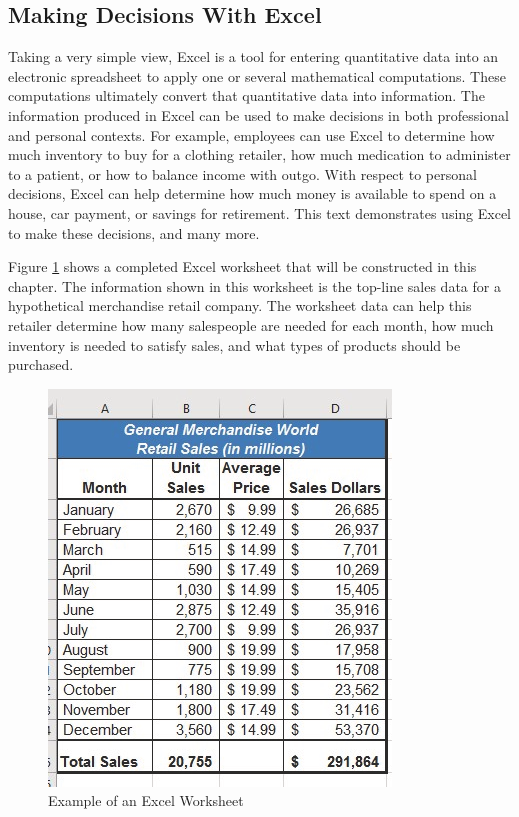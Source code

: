 \subsection{Making Decisions With Excel}

Taking a very simple view, Excel is a tool for entering quantitative data into an electronic spreadsheet to apply one or several mathematical computations. These computations ultimately convert that quantitative data into information. The information produced in Excel can be used to make decisions in both professional and personal contexts. For example, employees can use Excel to determine how much inventory to buy for a clothing retailer, how much medication to administer to a patient, or how to balance income with outgo. With respect to personal decisions, Excel can help determine how much money is available to spend on a house, car payment, or savings for retirement. This text demonstrates using Excel to make these decisions, and many more.

Figure \ref{01:fig01} shows a completed Excel worksheet that will be constructed in this chapter. The information shown in this worksheet is the top-line sales data for a hypothetical merchandise retail company. The worksheet data can help this retailer determine how many salespeople are needed for each month, how much inventory is needed to satisfy sales, and what types of products should be purchased.

\begin{figure}[H]
	\centering
	\includegraphics[width=\maxwidth{.95\linewidth}]{gfx/ch01_fig01}
	\caption{Example of an Excel Worksheet}
	\label{01:fig01}
\end{figure}

